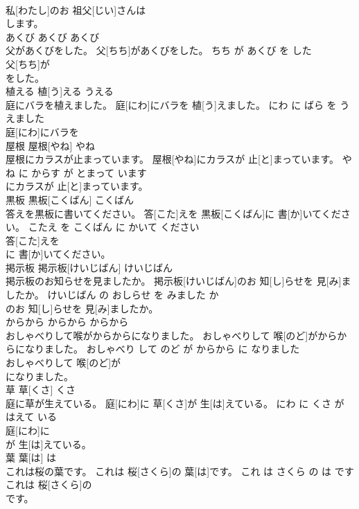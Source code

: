 \documentclass[8pt]{extreport}
\begin{document}
\begin{CJK}{UTF8}{min}
\\	私[わたし]のお 祖父[じい]さんは
\\	します。			
\\	あくび	あくび	あくび	
\\	父があくびをした。	父[ちち]があくびをした。	ちち が あくび を した	
\\	父[ちち]が
\\	をした。			
\\	植える	植[う]える	うえる	
\\	庭にバラを植えました。	庭[にわ]にバラを 植[う]えました。	にわ に ばら を うえました	
\\	庭[にわ]にバラを
\\	屋根	屋根[やね]	やね	
\\	屋根にカラスが止まっています。	屋根[やね]にカラスが 止[と]まっています。	やね に からす が とまって います	
\\	にカラスが 止[と]まっています。			
\\	黒板	黒板[こくばん]	こくばん	
\\	答えを黒板に書いてください。	答[こた]えを 黒板[こくばん]に 書[か]いてください。	こたえ を こくばん に かいて ください	
\\	答[こた]えを
\\	に 書[か]いてください。			
\\	掲示板	掲示板[けいじばん]	けいじばん	
\\	掲示板のお知らせを見ましたか。	掲示板[けいじばん]のお 知[し]らせを 見[み]ましたか。	けいじばん の おしらせ を みました か	
\\	のお 知[し]らせを 見[み]ましたか。			
\\	からから	からから	からから	
\\	おしゃべりして喉がからからになりました。	おしゃべりして 喉[のど]がからからになりました。	おしゃべり して のど が からから に なりました	
\\	おしゃべりして 喉[のど]が
\\	になりました。			
\\	草	草[くさ]	くさ	
\\	庭に草が生えている。	庭[にわ]に 草[くさ]が 生[は]えている。	にわ に くさ が はえて いる	
\\	庭[にわ]に
\\	が 生[は]えている。			
\\	葉	葉[は]	は	
\\	これは桜の葉です。	これは 桜[さくら]の 葉[は]です。	これ は さくら の は です	
\\	これは 桜[さくら]の
\\	です。			

\end{CJK}
\end{document}
